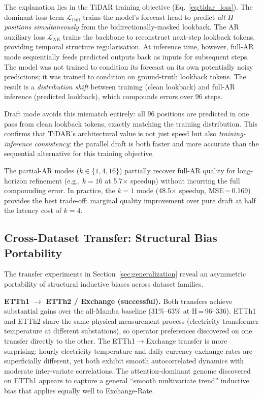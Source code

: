 The explanation lies in the TiDAR training objective (Eq.~\eqref{eq:tidar_loss}).
The dominant loss term $\mathcal{L}_{\mathrm{Diff}}$ trains the model's forecast head to predict \emph{all $H$ positions simultaneously} from the bidirectionally-masked lookback.
The AR auxiliary loss $\mathcal{L}_{\mathrm{AR}}$ trains the backbone to reconstruct next-step lookback tokens, providing temporal structure regularisation.
At inference time, however, full-AR mode sequentially feeds predicted outputs back as inputs for subsequent steps.
The model was not trained to condition its forecast on its own potentially noisy predictions; it was trained to condition on ground-truth lookback tokens.
The result is a \emph{distribution shift} between training (clean lookback) and full-AR inference (predicted lookback), which compounds errors over 96 steps.

Draft mode avoids this mismatch entirely: all 96 positions are predicted in one pass from clean lookback tokens, exactly matching the training distribution.
This confirms that TiDAR's architectural value is not just speed but also \emph{training-inference consistency}: the parallel draft is both faster and more accurate than the sequential alternative for this training objective.

The partial-AR modes ($k \in \{1, 4, 16\}$) partially recover full-AR quality for long-horizon refinement (e.g., $k=16$ at 5.7$\times$ speedup) without incurring the full compounding error.
In practice, the $k=1$ mode (48.5$\times$ speedup, MSE\,=\,0.169) provides the best trade-off: marginal quality improvement over pure draft at half the latency cost of $k=4$.

\subsection{Cross-Dataset Transfer: Structural Bias Portability}

The transfer experiments in Section~\ref{sec:generalization} reveal an asymmetric portability of structural inductive biases across dataset families.

\textbf{ETTh1 $\to$ ETTh2 / Exchange (successful).}
Both transfers achieve substantial gains over the all-Mamba baseline (31\%--63\% at H\,=\,96--336).
ETTh1 and ETTh2 share the same physical measurement process (electricity transformer temperature at different substations), so operator preferences discovered on one transfer directly to the other.
The ETTh1$\to$Exchange transfer is more surprising: hourly electricity temperature and daily currency exchange rates are superficially different, yet both exhibit smooth autocorrelated dynamics with moderate inter-variate correlations.
The attention-dominant genome discovered on ETTh1 appears to capture a general ``smooth multivariate trend'' inductive bias that applies equally well to Exchange-Rate.

